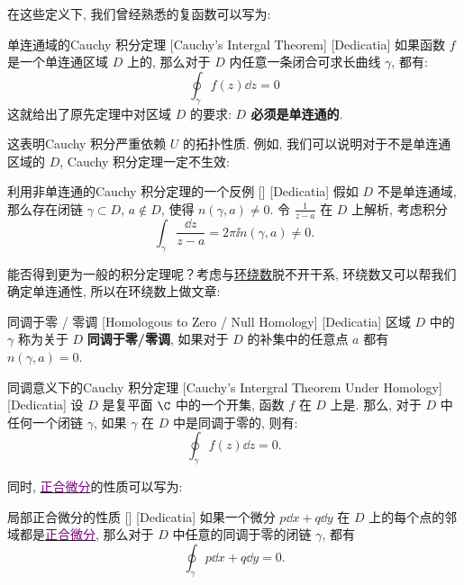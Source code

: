 \documentclass[UTF8]{ctexart}
\newcommand{\hyperrefc}[2]{\hyperref[#1]{\textcolor{purple}{#2}}}
\begin{document}
        在这些定义下, 我们曾经熟悉的复函数可以写为: 

        \begin{thm}
            [UUID]
            {单连通域的Cauchy 积分定理}
            [Cauchy's Intergal Theorem]
            [Dedicatia]
            如果函数 \(f\) 是一个单连通区域 \(D\) 上的, 那么对于 \(D\) 内任意一条闭合可求长曲线 \(\gamma\), 都有: 
            \[\oint_{\gamma} f(z) \dd z = 0\]
            这就给出了原先定理中对区域 \(D\) 的要求: \textbf{ \(D\) 必须是单连通的}. 
        \end{thm}

        这表明Cauchy 积分严重依赖 \(U\) 的拓扑性质. 例如, 我们可以说明对于不是单连通区域的 \(D\), Cauchy 积分定理一定不生效: 

        \begin{cxmp}
            [UUID]
            {利用非单连通的Cauchy 积分定理的一个反例}
            []
            [Dedicatia]
            假如 \(D\) 不是单连通域, 那么存在闭链 \(\gamma\subset D\),  \(a\notin D\), 使得 \(n(\gamma,a)\neq 0\). 令 \(\frac{1}{z-a}\) 在 \(D\) 上解析, 考虑积分
            \[\int_\gamma\frac{\dd{z}}{z-a}=2\pi\ii n(\gamma,a)\neq 0.\]
        \end{cxmp}

        能否得到更为一般的积分定理呢？考虑\CauchyThm 与\hyperref[dfn:WindingNumber]{环绕数}脱不开干系, 环绕数又可以帮我们确定单连通性, 所以在环绕数上做文章: 

        \begin{dfn}
            [NullHomologous]
            {同调于零 / 零调}
            [Homologous to Zero / Null Homology]
            [Dedicatia]
            区域 \(D\) 中的 \(\gamma\) 称为关于 \(D\) \textbf{同调于零/零调}, 如果对于 \(D\) 的补集中的任意点 \(a\) 都有 \(n(\gamma,a)=0\).
        \end{dfn}
        
        \begin{thm}
            [UUID]
            {同调意义下的Cauchy 积分定理}
            [Cauchy's Intergral Theorem Under Homology]
            [Dedicatia]
            设 \(D\) 是复平面 \(\C\) 中的一个开集, 函数 \(f\) 在 \(D\) 上是. 那么, 对于 \(D\) 中任何一个闭链 \(\gamma\), 如果 \(\gamma\) 在 \(D\) 中是同调于零的, 则有: 
            \[\oint_{\gamma} f(z) \dd z = 0.\]
        \end{thm}

        同时, \hyperrefc{dfn:ExactDifferential}{正合微分}的性质可以写为: 

        \begin{ppt}
            [UUID]
            {局部正合微分的性质}
            []
            [Dedicatia]
            如果一个微分 \(p\dd{x}+q\dd{y}\) 在 \(D\) 上的每个点的邻域都是\hyperrefc{dfn:ExactDifferential}{正合微分}, 那么对于 \(D\) 中任意的同调于零的闭链 \(\gamma\), 都有
            \[\oint_\gamma p\dd{x}+q\dd{y}=0.\]
        \end{ppt}
\end{document}
